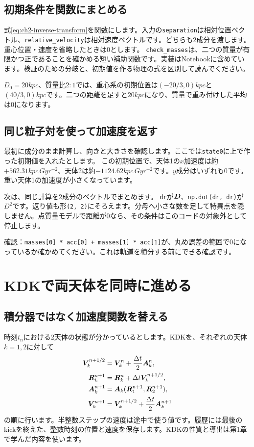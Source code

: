 \subsection{初期条件を関数にまとめる}
式\eqref{eq:ch2-inverse-transform}を関数にします。入力の\texttt{separation}は相対位置ベクトル、\texttt{relative\_\allowbreak velocity}は相対速度ベクトルです。どちらも2成分を渡します。重心位置・速度を省略したときは0とします。
\texttt{check\_masses}は、二つの質量が有限かつ正であることを確かめる短い補助関数です。実装はNotebookに含めています。検証のための分岐と、初期値を作る物理の式を区別して読んでください。

$D_0=20\unit{kpc}$、質量比$2:1$では、重心系の初期位置は$(-20/3,0)\unit{kpc}$と$(40/3,0)\unit{kpc}$です。二つの距離を足すと$20\unit{kpc}$になり、質量で重み付けした平均は0になります。

\subsection{同じ粒子対を使って加速度を返す}
最初に成分のまま計算し、向きと大きさを確認します。ここでは\texttt{state0}に上で作った初期値を入れたとします。
この初期位置で、天体1の$x$加速度は約$+562.31\unit{kpc\,Gyr^{-2}}$、天体2は約$-1124.62\unit{kpc\,Gyr^{-2}}$です。$y$成分はいずれも0です。重い天体1の加速度が小さくなっています。

次は、同じ計算を2成分のベクトルでまとめます。
\texttt{dr}が$\boldsymbol D$、\texttt{np.dot(dr, dr)}が$D^2$です。返り値も形\texttt{(2, 2)}にそろえます。分母へ小さな数を足して特異点を隠しません。点質量モデルで距離が0なら、その条件はこのコードの対象外として停止します。

確認：\texttt{masses[0] * acc[0] + masses[1] * acc[1]}が、丸め誤差の範囲で0になっているか確かめてください。これは軌道を積分する前にできる確認です。

\section{KDKで両天体を同時に進める}
\label{sec:ch2-kdk}
\subsection{積分器ではなく加速度関数を替える}
時刻$t_n$における2天体の状態が分かっているとします。KDKを、それぞれの天体$k=1,2$に対して
\begin{align}
\boldsymbol V_k^{n+1/2}&=\boldsymbol V_k^n+\frac{\Delta t}{2}\boldsymbol A_k^n,\nonumber\\
\boldsymbol R_k^{n+1}&=\boldsymbol R_k^n+\Delta t\boldsymbol V_k^{n+1/2},\nonumber\\
\boldsymbol A_k^{n+1}&=\boldsymbol A_k(\boldsymbol R_1^{n+1},\boldsymbol R_2^{n+1}),\nonumber\\
\boldsymbol V_k^{n+1}&=\boldsymbol V_k^{n+1/2}+\frac{\Delta t}{2}\boldsymbol A_k^{n+1}
\label{eq:ch2-kdk}
\end{align}
の順に行います。半整数ステップの速度は途中で使う値です。履歴には最後のkickを終えた、整数時刻の位置と速度を保存します。KDKの性質と導出は第1章で学んだ内容を使います。\cite{simten2007}

